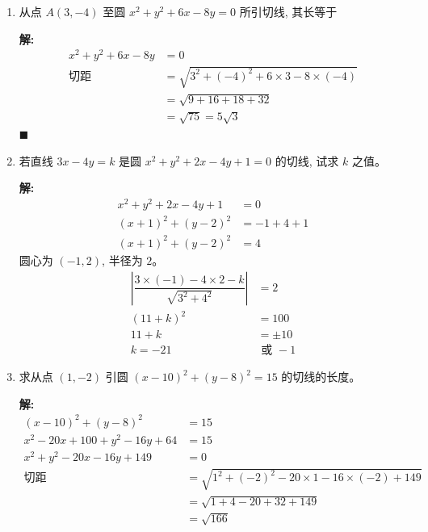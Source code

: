 \documentclass[10pt]{article}
\newcommand{\sol}{\textbf{解:} }
\begin{document}
\begin{enumerate}[leftmargin=*]
  \item 从点 $A(3,-4)$ 至圆 $x^{2}+y^{2}+6 x-8 y=0$ 所引切线, 其长等于

        \sol{}
        \begin{align*}
          x^{2}+y^{2}+6 x-8 y & = 0                                                    \\
          \text{切距}           & = \sqrt{3^{2} + (-4)^{2} + 6 \times 3 - 8 \times (-4)} \\
                              & = \sqrt{9 + 16 + 18 + 32}                              \\
                              & = \sqrt{75} = 5\sqrt{3}
        \end{align*} \hfill$\blacksquare$

  \item 若直线 $3 x-4 y=k$ 是圆 $x^{2}+y^{2}+2 x-4 y+1=0$ 的切线, 试求 $k$ 之值。

        \sol{}
        \begin{align*}
          x^{2}+y^{2}+2 x-4 y+1 & = 0          \\
          (x+1)^{2}+(y-2)^{2}   & = -1 + 4 + 1 \\
          (x+1)^{2}+(y-2)^{2}   & = 4
        \end{align*}
        圆心为 $(-1, 2)$, 半径为 $2$。
        \begin{align*}
          \left\vert \dfrac{3 \times (-1) - 4 \times 2 - k}{\sqrt{3^{2} + 4^{2}}} \right\vert & = 2           \\
          (11 + k)^2                                                                          & = 100         \\
          11 + k                                                                              & = \pm 10      \\
          k = -21                                                                             & \text{ 或 } -1
        \end{align*}

        \newpage
  \item 求从点 $(1,-2)$ 引圆 $(x-10)^{2}+(y-8)^{2}=15$ 的切线的长度。

        \sol{}
        \begin{align*}
          (x-10)^{2}+(y-8)^{2}       & = 15                                                           \\
          x^{2}-20x+100+y^{2}-16y+64 & = 15                                                           \\
          x^{2}+y^{2}-20x-16y+149    & = 0                                                            \\
          \text{切距}                  & = \sqrt{1^{2} + (-2)^{2} - 20 \times 1 - 16 \times (-2) + 149} \\
                                     & = \sqrt{1 + 4 - 20 + 32 + 149}                                 \\
                                     & = \sqrt{166}
        \end{align*}


\end{enumerate}
\end{document}
